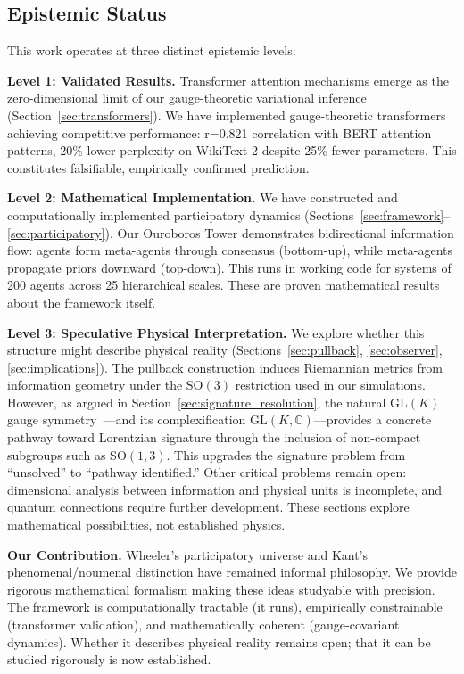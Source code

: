 \documentclass[11pt]{article}
\begin{document}
\subsection{Epistemic Status}

This work operates at three distinct epistemic levels:

\textbf{Level 1: Validated Results.} Transformer attention mechanisms emerge as the zero-dimensional limit of our gauge-theoretic variational inference (Section~\ref{sec:transformers}). We have implemented gauge-theoretic transformers achieving competitive performance: r=0.821 correlation with BERT attention patterns, 20\% lower perplexity on WikiText-2 despite 25\% fewer parameters. This constitutes falsifiable, empirically confirmed prediction.

\textbf{Level 2: Mathematical Implementation.} We have constructed and computationally implemented participatory dynamics (Sections~\ref{sec:framework}--\ref{sec:participatory}). Our Ouroboros Tower demonstrates bidirectional information flow: agents form meta-agents through consensus (bottom-up), while meta-agents propagate priors downward (top-down). This runs in working code for systems of 200 agents across 25 hierarchical scales. These are proven mathematical results about the framework itself.

\textbf{Level 3: Speculative Physical Interpretation.} We explore whether this structure might describe physical reality (Sections~\ref{sec:pullback}, \ref{sec:observer}, \ref{sec:implications}). The pullback construction induces Riemannian metrics from information geometry under the $\mathrm{SO}(3)$ restriction used in our simulations. However, as argued in Section~\ref{sec:signature_resolution}, the natural $\mathrm{GL}(K)$ gauge symmetry~\cite{Dennis2026GL}---and its complexification $\mathrm{GL}(K, \mathbb{C})$---provides a concrete pathway toward Lorentzian signature through the inclusion of non-compact subgroups such as $\mathrm{SO}(1,3)$. This upgrades the signature problem from ``unsolved'' to ``pathway identified.'' Other critical problems remain open: dimensional analysis between information and physical units is incomplete, and quantum connections require further development. These sections explore mathematical possibilities, not established physics.

\textbf{Our Contribution.} Wheeler's participatory universe and Kant's phenomenal/noumenal distinction have remained informal philosophy. We provide rigorous mathematical formalism making these ideas studyable with precision. The framework is computationally tractable (it runs), empirically constrainable (transformer validation), and mathematically coherent (gauge-covariant dynamics). Whether it describes physical reality remains open; that it can be studied rigorously is now established.
\end{document}
